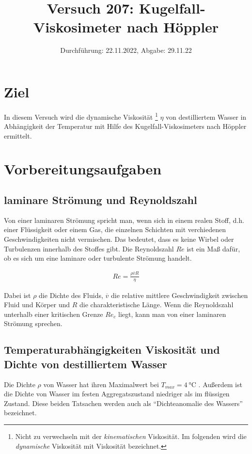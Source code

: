 

\title{Versuch 207: Kugelfall-Viskosimeter nach Höppler}
\date{Durchführung: 22.11.2022, Abgabe: 29.11.22}



\maketitle

\tableofcontents
\newpage

\section{Ziel}
In diesem Versuch wird die dynamische Viskosität
\footnote{Nicht zu verwechseln mit der \textit{kinematischen} Viskosität. Im folgenden wird die \textit{dynamische} Viskosität mit Viskosität bezeichnet.} $\eta$ 
von destilliertem Wasser in Abhängigkeit der Temperatur mit Hilfe des Kugelfall-Viskosimeters nach Höppler ermittelt.

\section{Vorbereitungsaufgaben}
\subsection{laminare Strömung und Reynoldszahl}
Von einer laminaren Strömung spricht man, wenn sich in einem realen Stoff, d.h. einer Flüssigkeit oder einem Gas,
die einzelnen Schichten mit verchiedenen Geschwindigkeiten nicht vermischen. Das bedeutet, dass es keine Wirbel oder
Turbulenzen innerhalb des Stoffes gibt.
Die Reynoldszahl $Re$ ist ein Maß dafür, ob es sich um eine laminare oder turbulente Strömung handelt\cite*[]{geschke}.

\begin{align}
    Re = \frac{\rho \overline{v} R}{\eta}
\end{align}

Dabei ist $\rho$ die Dichte des Fluids, $\overline{v}$ die relative mittlere Geschwindigkeit zwischen Fluid und Körper und
$R$ die charakteristische Länge.
Wenn die Reynoldszahl unterhalb einer kritischen Grenze $Re_c$ liegt, kann man von einer laminaren Strömung sprechen.

\subsection{Temperaturabhängigkeiten Viskosität und Dichte von destilliertem Wasser}
Die Dichte $\rho$ von Wasser hat ihren Maximalwert bei $T_{max} = \qty[]{4}{\degreeCelsius}$ \cite*[]{geschke}.
Außerdem ist die Dichte von Wasser im festen Aggregatszustand niedriger als im flüssigen Zustand. 
Diese beiden Tatsachen werden auch als \enquote{Dichteanomalie des Wassers} bezeichnet\cite*[]{demtroeder}.

